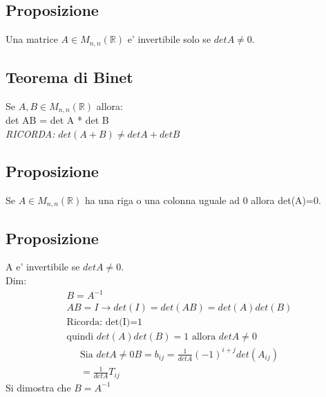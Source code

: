 \documentclass[a4paper,12pt]{article}
\begin{document}
\subsection{Proposizione}
Una matrice $A\in M_{n,n}(\mathbb{R})$ e' invertibile solo se $detA\neq0$.
\subsection{Teorema di Binet}
Se $A,B\in M_{n,n}(\mathbb{R})$ allora:
\\det AB = det A * det B \\
\textit{RICORDA:} $det (A+B) \neq det A + det B$
\subsection{Proposizione}
Se $A\in M_{n,n}(\mathbb{R})$ ha una riga o una colonna uguale ad 0 allora det(A)=0.
\subsection{Proposizione}
A e' invertibile se $det A \neq 0$.
\\Dim:
\begin{align*}
    B=A^{-1} \\
    AB=I \to det(I)=det(AB)=det(A)det(B)
    \\\text{Ricorda: det(I)=1}
    \\\text{quindi } det(A)det(B)=1 \text{ allora } detA\neq 0
\end{align*}
\begin{align*}
    \text{Sia } detA\neq0
    B=b_{ij}=\frac{1}{detA}(-1)^{i+j}det(A_{ij})
    \\ =\frac{1}{detA}T_{ij}
\end{align*}
Si dimostra che $B=A^{-1}$
\end{document}
